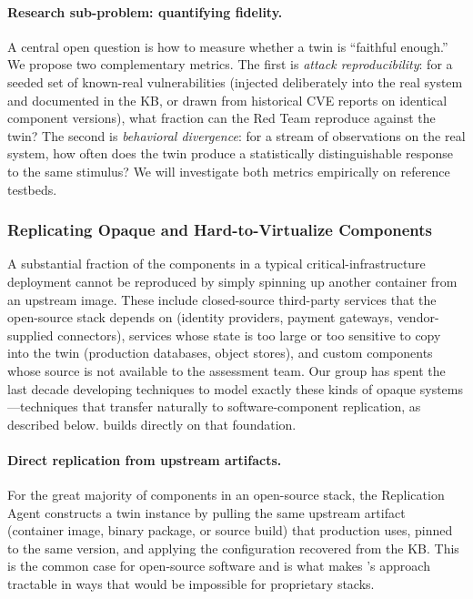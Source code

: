 \paragraph{Research sub-problem: quantifying fidelity.}
A central open question is how to measure whether a twin is
``faithful enough.'' We propose two complementary metrics. The first
is \emph{attack reproducibility}: for a seeded set of known-real
vulnerabilities (injected deliberately into the real system and
documented in the KB, or drawn from historical CVE reports on identical
component versions), what fraction can the Red Team reproduce against
the twin? The second is \emph{behavioral divergence}: for a stream of
observations on the real system, how often does the twin produce a
statistically distinguishable response to the same stimulus? We will
investigate both metrics empirically on reference testbeds.

\subsubsection{Replicating Opaque and Hard-to-Virtualize Components}

A substantial fraction of the components in a typical
critical-infrastructure deployment cannot be reproduced by simply
spinning up another container from an upstream image. These include
closed-source third-party services that the open-source stack depends
on (identity providers, payment gateways, vendor-supplied connectors),
services whose state is too large or too sensitive to copy into the
twin (production databases, object stores), and custom components
whose source is not available to the assessment team. Our group has
spent the last decade developing techniques to model exactly these
kinds of opaque systems---techniques that transfer naturally to
software-component replication, as described below. \sysname builds
directly on that foundation.

\paragraph{Direct replication from upstream artifacts.}
For the great majority of components in an open-source stack, the
Replication Agent constructs a twin instance by pulling the same
upstream artifact (container image, binary package, or source build)
that production uses, pinned to the same version, and applying the
configuration recovered from the KB. This is the common case for
open-source software and is what makes \sysname's approach tractable
in ways that would be impossible for proprietary stacks.

